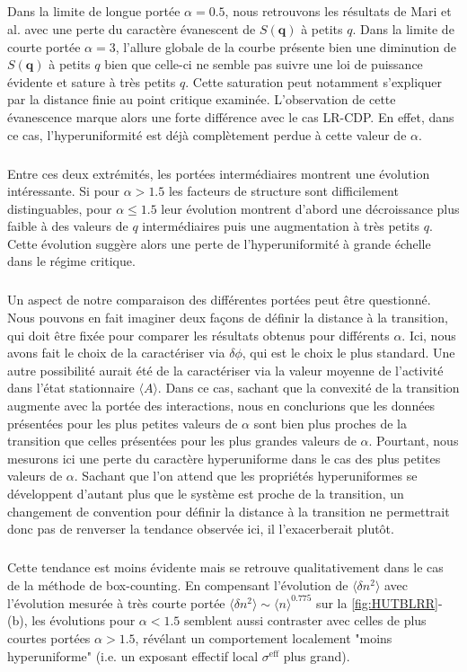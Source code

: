 \subparagraph{}Dans la limite de longue portée $\alpha = 0.5$, nous retrouvons les résultats de Mari et al. \cite{mari_absorbing_2022} avec une perte du caractère évanescent de $S(\mathbf{q})$ à petits $q$. Dans la limite de courte portée $\alpha = 3$, l'allure globale de la courbe présente bien une diminution de $S(\mathbf{q})$ à petits $q$ bien que celle-ci ne semble pas suivre une loi de puissance évidente et sature à très petits $q$. Cette saturation peut notamment s'expliquer par la distance finie au point critique examinée. L'observation de cette évanescence marque alors une forte différence avec le cas LR-CDP. En effet, dans ce cas, l'hyperuniformité est déjà complètement perdue à cette valeur de $\alpha$.  

\subparagraph{}Entre ces deux extrémités, les portées intermédiaires montrent une évolution intéressante. Si pour $\alpha > 1.5$ les facteurs de structure sont difficilement distinguables, pour $\alpha \leq 1.5$ leur évolution montrent d'abord une décroissance plus faible à des valeurs de $q$ intermédiaires puis une augmentation à très petits $q$. Cette évolution suggère alors une perte de l'hyperuniformité à grande échelle dans le régime critique.

\subparagraph{}Un aspect de notre comparaison des différentes portées peut être questionné. Nous pouvons en fait imaginer deux façons de définir la distance à la transition, qui doit être fixée pour comparer les résultats obtenus pour différents $\alpha$. Ici, nous avons fait le choix de la caractériser via $\delta\phi$, qui est le choix le plus standard. Une autre possibilité aurait été de la caractériser via la valeur moyenne de l'activité dans l'état stationnaire $\langle A \rangle$. Dans ce cas, sachant que la convexité de la transition augmente avec la portée des interactions, nous en conclurions que les données présentées pour les plus petites valeurs de $\alpha$ sont bien plus proches de la transition que celles présentées pour les  plus grandes valeurs de $\alpha$. Pourtant, nous mesurons ici une perte du caractère hyperuniforme dans le cas des plus petites valeurs de $\alpha$. Sachant que l'on attend que les propriétés hyperuniformes se développent d'autant plus que le système est proche de la transition, un changement de convention pour définir la distance à la transition ne permettrait donc pas de renverser la tendance observée ici, il l'exacerberait plutôt.

\subparagraph{}Cette tendance est moins évidente  mais se retrouve qualitativement dans le cas de la méthode de box-counting. En compensant l'évolution de $\langle \delta n^2 \rangle$ avec l'évolution mesurée à très courte portée $\langle \delta n^2 \rangle \sim \langle n \rangle^{0.775}$ sur la \autoref{fig:HUTBLRR}-(b), les évolutions pour $\alpha<1.5$ semblent aussi contraster avec celles de plus courtes portées $\alpha>1.5$, révélant un comportement localement "moins hyperuniforme" (i.e. un exposant effectif local $\sigma^\text{eff}$ plus grand).

